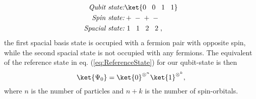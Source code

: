 \begin{align*}
    \textit{Qubit state:} & \ket{0 \: \; \ 0 \: \; \ 1 \: \; \ 1 } \\
    \textit{Spin state:} & + \; - \; + \; - \; \\
    \textit{Spacial state:} & \ 1 \; \: \ 1 \ \; \: 2 \ \; \: 2 \; ,
\end{align*}
the first spacial basis state is occupied with a fermion pair with opposite spin, while the second spacial state is not occupied with any fermions.
The equivalent of the reference state in eq. (\ref{eq:ReferenceState}) for our qubit-state is then
\begin{equation}
    \label{eq:qubitReferenceState}
    \ket{\Psi_0} = \ket{0}^{\otimes^n}\ket{1}^{\otimes^k},
\end{equation}
where $n$ is the number of particles and $n+k$ is the number of spin-orbitals.

